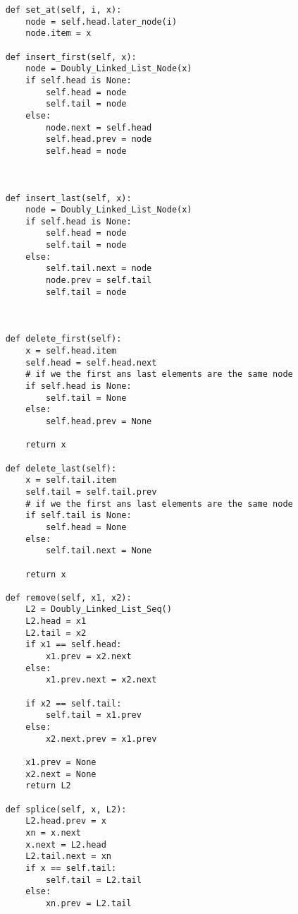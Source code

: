 \documentclass[12pt,twoside]{article}
\begin{document}
\begin{problems}
\begin{problemparts}
\begin{lstlisting}
    def set_at(self, i, x):
        node = self.head.later_node(i)
        node.item = x

    def insert_first(self, x):
        node = Doubly_Linked_List_Node(x)
        if self.head is None:
            self.head = node
            self.tail = node
        else:
            node.next = self.head
            self.head.prev = node
            self.head = node
            


    def insert_last(self, x):
        node = Doubly_Linked_List_Node(x)
        if self.head is None:
            self.head = node
            self.tail = node
        else:
            self.tail.next = node
            node.prev = self.tail
            self.tail = node

            

    def delete_first(self):
        x = self.head.item
        self.head = self.head.next
        # if we the first ans last elements are the same node
        if self.head is None:
            self.tail = None
        else:
            self.head.prev = None

        return x

    def delete_last(self):
        x = self.tail.item
        self.tail = self.tail.prev 
        # if we the first ans last elements are the same node
        if self.tail is None:
            self.head = None
        else:
            self.tail.next = None

        return x

    def remove(self, x1, x2):
        L2 = Doubly_Linked_List_Seq()
        L2.head = x1
        L2.tail = x2
        if x1 == self.head:
            x1.prev = x2.next
        else:
            x1.prev.next = x2.next

        if x2 == self.tail:
            self.tail = x1.prev
        else:
            x2.next.prev = x1.prev

        x1.prev = None
        x2.next = None
        return L2

    def splice(self, x, L2):
        L2.head.prev = x
        xn = x.next
        x.next = L2.head
        L2.tail.next = xn
        if x == self.tail:
            self.tail = L2.tail
        else:
            xn.prev = L2.tail
\end{lstlisting}
\end{problemparts}

\end{problems}
\end{document}
